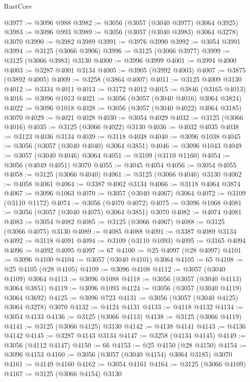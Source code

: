 \begin{lexlean}{RustCore}
\begin{coremodule}
@3977 := @3096 @988
@3982 := @3056 (@3057 (@3040 @3977) @3064 @3925)
@3983 := @3096 @993
@3989 := @3056 (@3057 (@3040 @3983) @3064 @3278) @3070
@3990 := @3982 @3989
@3991 := @3976 @3990
@3992 := @3054 @3991
@3994 := @3125 (@3066 @3906)
@3996 := @3125 (@3066 @3977)
@3999 := @3125 (@3066 @3983) @3130
@4000 := @3996 @3999
@4001 := @3994 @4000
@4003 := @3287 @4001 @3134
@4005 := @3905 (@3992 @4003)
@4007 := @3875 (@3892 @4005)
@4009 := @3258 (@3864 @4007)
@4011 := @3125 @4009 @3130
@4012 := @3334 @4011
@4013 := @3172 @4012
@4015 := @3846 (@3165 @4013)
@4016 := @3096 @1013
@4021 := @3056 (@3057 (@3040 @4016) @3064 @3824)
@4022 := @3096 @1018
@4028 := @3056 (@3057 (@3040 @4022) @3064 @3185) @3070
@4029 := @4021 @4028
@4030 := @3054 @4029
@4032 := @3125 (@3066 @4016)
@4035 := @3125 (@3066 @4022) @3130
@4036 := @4032 @4035
@4038 := @3123 @4036 @3134
@4039 := @3118 @4038
@4040 := @3096 @1038
@4045 := @3056 (@3057 (@3040 @4040) @3064 @3851)
@4046 := @3096 @1043
@4049 := @3057 (@3040 @4046) @3064
@4051 := @3109 (@3110 @1160)
@4054 := @3056 (@4049 @4051) @3070
@4055 := @4045 @4054
@4056 := @3054 @4055
@4058 := @3125 (@3066 @4040)
@4061 := @3125 (@3066 @4046) @3130
@4062 := @4058 @4061
@4064 := @3387 @4062 @3134
@4066 := @3118 @4064 @3874
@4067 := @3096 @1063
@4070 := @3057 (@3040 @4067) @3064
@4072 := @3109 (@3110 @1172)
@4074 := @3056 (@4070 @4072)
@4075 := @3096 @1068
@4081 := @3056 (@3057 (@3040 @4075) @3064 @3851) @3070
@4082 := @4074 @4081
@4083 := @3054 @4082
@4085 := @3125 (@3066 @4067)
@4088 := @3125 (@3066 @4075) @3130
@4089 := @4085 @4088
@4091 := @3387 @4089 @3134
@4092 := @3118 @4091
@4094 := @3109 (@3110 @1093)
@4095 := @3165 @4094
@4096 := @4092 @4095
@4097 := 67
@4100 := @25 @4097 (@28 @4097)
@4101 := @3096 @4100
@4104 := @3057 (@3040 @4101) @3064
@4105 := 65
@4108 := @25 @4105 (@28 @4105)
@4109 := @3096 @4108
@4112 := @3057 (@3040 @4109) @3064
@4113 := @3096 @1088
@4118 := @3056 (@3057 (@3040 @4113) @3064 @3851)
@4119 := @3096 @1093
@4124 := @3056 (@3057 (@3040 @4119) @3064 @3692)
@4125 := @3096 @723
@4131 := @3056 (@3057 (@3040 @4125) @3064 @3278) @3070
@4132 := @4124 @4131
@4133 := @4118 @4132
@4134 := @3054 @4133
@4136 := @3125 (@3066 @4113)
@4138 := @3125 (@3066 @4119)
@4141 := @3125 (@3066 @4125) @3130
@4142 := @4138 @4141
@4143 := @4136 @4142
@4145 := @3287 @4143 @3134
@4147 := @3258 (@4134 @4145)
@4149 := @3056 (@4112 @4147)
@4150 := 66
@4153 := @25 @4150 (@28 @4150)
@4154 := @3096 @4153
@4160 := @3056 (@3057 (@3040 @4154) @3064 @3185) @3070
@4161 := @4149 @4160
@4162 := @3054 @4161
@4164 := @3125 (@3066 @4109)
@4167 := @3125 (@3066 @4154) @3130

\end{coremodule}
\end{lexlean}
